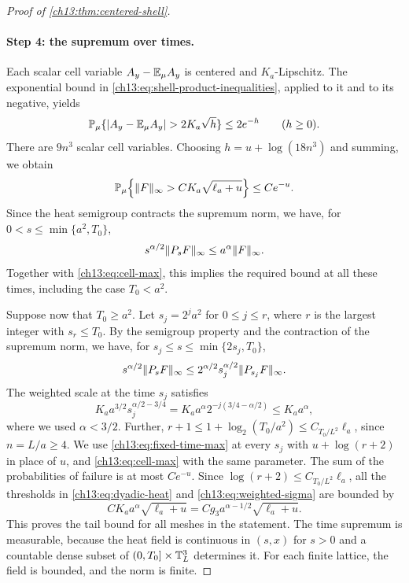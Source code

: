 \begin{proof}[Proof of \cref{ch13:thm:centered-shell}]
\paragraph{Step 4: the supremum over times.}
Each scalar cell variable $A_y-\mathbb E_\mu A_y$ is centered and $K_a$-Lipschitz. The exponential bound in \eqref{ch13:eq:shell-product-inequalities}, applied to it and to its negative, yields
\[
 \mathbb P_\mu\{\lvert A_y-\mathbb E_\mu A_y\rvert>2K_a\sqrt h\}\le2e^{-h}\qquad(h\ge0).
\]
There are $9n^3$ scalar cell variables. Choosing $h=u+\log(18n^3)$ and summing, we obtain
\begin{equation}\label{ch13:eq:cell-max}
 \mathbb P_\mu\Bigl\{\lVert F\rVert_\infty>CK_a\sqrt{\ell_a+u}\Bigr\}\le Ce^{-u}.
\end{equation}
Since the heat semigroup contracts the supremum norm, we have, for $0<s\le\min\{a^2,T_0\}$,
\[
 s^{\alpha/2}\lVert P_sF\rVert_\infty\le a^\alpha\lVert F\rVert_\infty.
\]
Together with \eqref{ch13:eq:cell-max}, this implies the required bound at all these times, including the case $T_0<a^2$.

Suppose now that $T_0\ge a^2$. Let $s_j=2^ja^2$ for $0\le j\le r$, where $r$ is the largest integer with $s_r\le T_0$. By the semigroup property and the contraction of the supremum norm, we have, for $s_j\le s\le\min\{2s_j,T_0\}$,
\begin{equation}\label{ch13:eq:dyadic-heat}
 s^{\alpha/2}\lVert P_sF\rVert_\infty\le2^{\alpha/2}s_j^{\alpha/2}\lVert P_{s_j}F\rVert_\infty.
\end{equation}
The weighted scale at the time $s_j$ satisfies
\begin{equation}\label{ch13:eq:weighted-sigma}
 K_aa^{3/2}s_j^{\alpha/2-3/4}=K_aa^\alpha2^{-j(3/4-\alpha/2)}\le K_aa^\alpha,
\end{equation}
where we used $\alpha<3/2$. Further, $r+1\le1+\log_2(T_0/a^2)\le C_{T_0/L^2}\ell_a$, since $n=L/a\ge4$. We use \eqref{ch13:eq:fixed-time-max} at every $s_j$ with $u+\log(r+2)$ in place of $u$, and \eqref{ch13:eq:cell-max} with the same parameter. The sum of the probabilities of failure is at most $Ce^{-u}$. Since $\log(r+2)\le C_{T_0/L^2}\ell_a$, all the thresholds in \eqref{ch13:eq:dyadic-heat} and \eqref{ch13:eq:weighted-sigma} are bounded by
\[
 CK_aa^\alpha\sqrt{\ell_a+u}=Cg_3a^{\alpha-1/2}\sqrt{\ell_a+u}.
\]
This proves the tail bound for all meshes in the statement. The time supremum is measurable, because the heat field is continuous in $(s,x)$ for $s>0$ and a countable dense subset of $(0,T_0]\times\mathbb T_L^3$ determines it. For each finite lattice, the field is bounded, and the norm is finite.


\end{proof}
